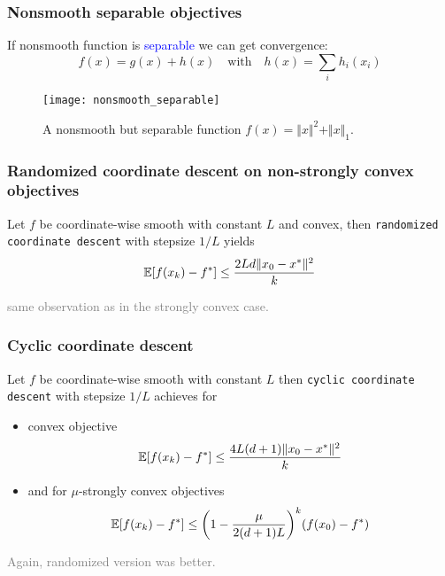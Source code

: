 \documentclass[aspectratio=149]{beamer}
\begin{document}
\begin{frame}
  \frametitle{Nonsmooth separable objectives}
  If nonsmooth function is \textcolor{blue}{separable} we can get convergence:
  \begin{equation}
    f(x) = g(x) + h(x) \quad \text{with} \quad h(x)= \sum_{i} h_i(x_i)
  \end{equation}
  \begin{figure}[ht]
    \centering
    \texttt{[image: nonsmooth\_separable]}
    \caption{A nonsmooth but separable function $f(x)= \Vert x \Vert^2 + \Vert x \Vert_1$.}
  \end{figure}
\end{frame}




\begin{frame}
  \frametitle{Randomized coordinate descent on non-strongly convex objectives}
  \begin{theorem}
    Let $f$ be coordinate-wise smooth with constant $L$ and convex, then \colorbox{gray!30}{\textup{\texttt{randomized coordinate descent}}} with stepsize $1/L$ yields
    \begin{equation}
      \mathbb{E} [f(x_k)-f^*] \le \frac{2L d \Vert x_0-x^* \Vert^2}{k}
    \end{equation}
  \end{theorem}
  \textcolor{gray}{same observation as in the strongly convex case.}
\end{frame}


\begin{frame}
  \frametitle{Cyclic coordinate descent}
  \begin{theorem}
    Let $f$ be coordinate-wise smooth with constant $L$ then \colorbox{gray!30}{\textup{\texttt{cyclic coordinate descent}}} with stepsize $1/L$ achieves for
    \begin{itemize}
      \item convex objective
            \begin{equation}
              \mathbb{E} [f(x_k)-f^*] \le \frac{4L (d+1) \Vert x_0-x^* \Vert^2}{k}
            \end{equation}
      \item and for $\mu$-strongly convex objectives
            \begin{equation}
              \mathbb{E} [f(x_k)-f^*] \le {\left( 1- \frac{\mu}{2(d+1)L} \right)}^k (f(x_0)-f^*)
            \end{equation}
    \end{itemize}
  \end{theorem}
  \textcolor{gray}{Again, randomized version was better.}
\end{frame}
\end{document}
